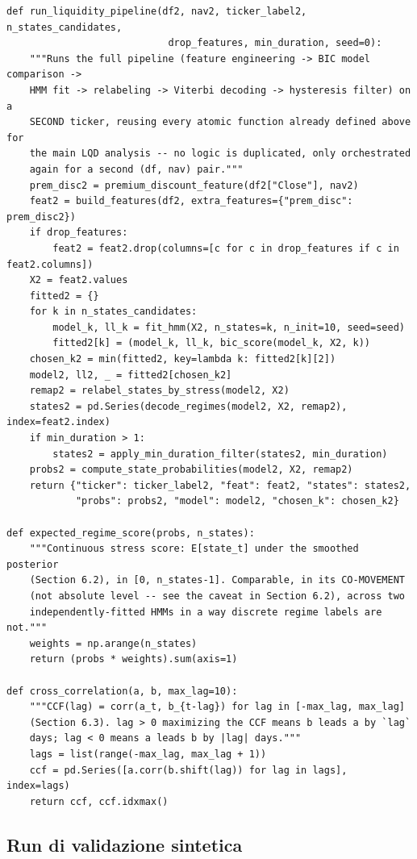 \documentclass[11pt]{article}
\theoremstyle{definition}
\theoremstyle{remark}
\begin{document}
\begin{lstlisting}
def run_liquidity_pipeline(df2, nav2, ticker_label2, n_states_candidates,
                            drop_features, min_duration, seed=0):
    """Runs the full pipeline (feature engineering -> BIC model comparison ->
    HMM fit -> relabeling -> Viterbi decoding -> hysteresis filter) on a
    SECOND ticker, reusing every atomic function already defined above for
    the main LQD analysis -- no logic is duplicated, only orchestrated
    again for a second (df, nav) pair."""
    prem_disc2 = premium_discount_feature(df2["Close"], nav2)
    feat2 = build_features(df2, extra_features={"prem_disc": prem_disc2})
    if drop_features:
        feat2 = feat2.drop(columns=[c for c in drop_features if c in feat2.columns])
    X2 = feat2.values
    fitted2 = {}
    for k in n_states_candidates:
        model_k, ll_k = fit_hmm(X2, n_states=k, n_init=10, seed=seed)
        fitted2[k] = (model_k, ll_k, bic_score(model_k, X2, k))
    chosen_k2 = min(fitted2, key=lambda k: fitted2[k][2])
    model2, ll2, _ = fitted2[chosen_k2]
    remap2 = relabel_states_by_stress(model2, X2)
    states2 = pd.Series(decode_regimes(model2, X2, remap2), index=feat2.index)
    if min_duration > 1:
        states2 = apply_min_duration_filter(states2, min_duration)
    probs2 = compute_state_probabilities(model2, X2, remap2)
    return {"ticker": ticker_label2, "feat": feat2, "states": states2,
            "probs": probs2, "model": model2, "chosen_k": chosen_k2}

def expected_regime_score(probs, n_states):
    """Continuous stress score: E[state_t] under the smoothed posterior
    (Section 6.2), in [0, n_states-1]. Comparable, in its CO-MOVEMENT
    (not absolute level -- see the caveat in Section 6.2), across two
    independently-fitted HMMs in a way discrete regime labels are not."""
    weights = np.arange(n_states)
    return (probs * weights).sum(axis=1)

def cross_correlation(a, b, max_lag=10):
    """CCF(lag) = corr(a_t, b_{t-lag}) for lag in [-max_lag, max_lag]
    (Section 6.3). lag > 0 maximizing the CCF means b leads a by `lag`
    days; lag < 0 means a leads b by |lag| days."""
    lags = list(range(-max_lag, max_lag + 1))
    ccf = pd.Series([a.corr(b.shift(lag)) for lag in lags], index=lags)
    return ccf, ccf.idxmax()
\end{lstlisting}

\subsection{Run di validazione sintetica}
\end{document}
